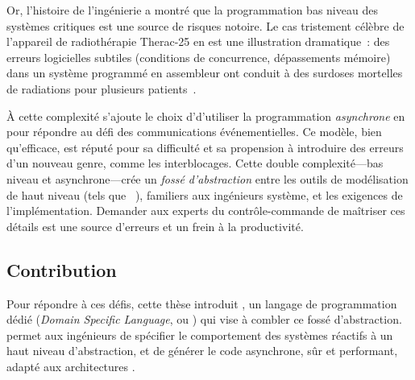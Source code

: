 Or, l'histoire de l'ingénierie a montré que la programmation bas niveau des systèmes critiques est
une source de risques notoire. Le cas tristement célèbre de l'appareil de radiothérapie Therac-25
en est une illustration dramatique~: des erreurs logicielles subtiles (conditions de concurrence,
dépassements mémoire) dans un système programmé en assembleur ont conduit à des surdoses mortelles
de radiations pour plusieurs patients~\cite{journals/computer/LevesonT93}.

À cette complexité s'ajoute le choix d'\ampere d'utiliser la programmation \emph{asynchrone} en
\Rust pour répondre au défi des communications événementielles. Ce modèle, bien qu'efficace, est
réputé pour sa difficulté et sa propension à introduire des erreurs d'un nouveau genre, comme les
interblocages. Cette double complexité---bas niveau et asynchrone---crée un \emph{fossé
      d'abstraction} entre les outils de modélisation de haut niveau (tels que
\Simulink~\cite{simulink}), familiers aux ingénieurs système, et les exigences de l'implémentation.
Demander aux experts du contrôle-commande de maîtriser ces détails est une source d'erreurs et un
frein à la productivité.

\subsection{Contribution}

Pour répondre à ces défis, cette thèse introduit \GRust, un langage de programmation dédié
(\textit{Domain Specific Language}, ou \dsl) qui vise à combler ce fossé d'abstraction. \GRust
permet aux ingénieurs de spécifier le comportement des systèmes réactifs à un haut niveau
d'abstraction, et de générer le code \Rust asynchrone, sûr et performant, adapté aux architectures
\sdv.


